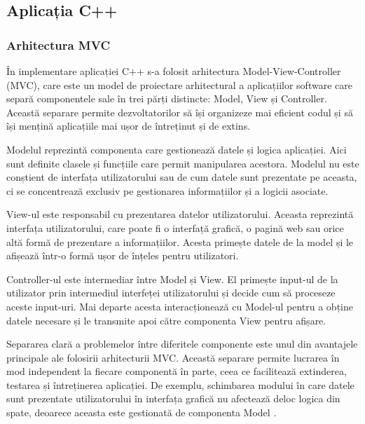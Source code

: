 \documentclass[12pt]{article}
\begin{document}
\subsection{Aplicația C++}

\subsubsection{Arhitectura MVC}

\^{I}n implementare aplicației C++ s-a folosit arhitectura Model-View-Controller (MVC), care este un model de proiectare arhitectural a aplicațiilor software care separ\u{a} componentele sale \^{i}n trei p\u{a}rți distincte: Model, View și Controller. Aceast\u{a} separare permite dezvoltatorilor s\u{a} \^{i}și organizeze mai eficient codul și s\u{a} \^{i}și mențin\u{a} aplicațiile mai ușor de \^{i}ntreținut și de extins.

Modelul reprezint\u{a} componenta care gestioneaz\u{a} datele și logica aplicației. Aici sunt definite clasele și funcțiile care permit manipularea acestora. Modelul nu este conștient de interfața utilizatorului sau de cum datele sunt prezentate pe aceasta, ci se concentreaz\u{a} exclusiv pe gestionarea informațiilor și a logicii asociate.

View-ul este responsabil cu prezentarea datelor utilizatorului. Aceasta reprezint\u{a} interfața utilizatorului, care poate fi o interfaț\u{a} grafic\u{a}, o pagin\u{a} web sau orice alt\u{a} form\u{a} de prezentare a informațiilor. Acesta primește datele de la model și le afișeaz\u{a} \^{i}ntr-o form\u{a} ușor de \^{i}nțeles pentru utilizatori.

Controller-ul este intermediar între Model și View. El primește input-ul de la utilizator prin intermediul interfeței utilizatorului și decide cum s\u{a} proceseze aceste input-uri. Mai departe acesta interacționeaz\u{a} cu Model-ul pentru a obține datele necesare și le transmite apoi către componenta View pentru afișare.

Separarea clar\u{a} a problemelor \^{i}ntre diferitele componente este unul din avantajele principale ale folosirii arhitecturii MVC. Aceast\u{a} separare permite lucrarea \^{i}n mod independent la fiecare component\u{a} \^{i}n parte, ceea ce faciliteaz\u{a} extinderea, testarea și \^{i}ntreținerea aplicației. De exemplu, schimbarea modului \^{i}n care datele sunt prezentate utilizatorului \^{i}n interfața grafic\u{a} nu afecteaz\u{a} deloc logica din spate, deoarece aceasta este gestionat\u{a} de componenta Model \cite{mvc}.
\end{document}
